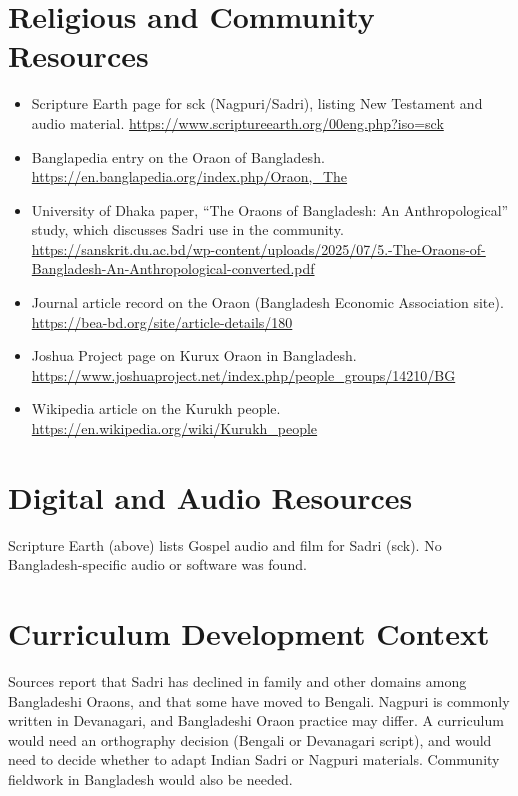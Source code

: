 \documentclass[12pt]{article}
\begin{document}
\section{Religious and Community Resources}
\begin{itemize}
\item Scripture Earth page for sck (Nagpuri/Sadri), listing New Testament and audio material. \url{https://www.scriptureearth.org/00eng.php?iso=sck}
\item Banglapedia entry on the Oraon of Bangladesh. \url{https://en.banglapedia.org/index.php/Oraon,_The}
\item University of Dhaka paper, ``The Oraons of Bangladesh: An Anthropological'' study, which discusses Sadri use in the community. \url{https://sanskrit.du.ac.bd/wp-content/uploads/2025/07/5.-The-Oraons-of-Bangladesh-An-Anthropological-converted.pdf}
\item Journal article record on the Oraon (Bangladesh Economic Association site). \url{https://bea-bd.org/site/article-details/180}
\item Joshua Project page on Kurux Oraon in Bangladesh. \url{https://www.joshuaproject.net/index.php/people_groups/14210/BG}
\item Wikipedia article on the Kurukh people. \url{https://en.wikipedia.org/wiki/Kurukh_people}
\end{itemize}

\section{Digital and Audio Resources}
Scripture Earth (above) lists Gospel audio and film for Sadri (sck). No Bangladesh-specific audio or software was found.

\section{Curriculum Development Context}
Sources report that Sadri has declined in family and other domains among Bangladeshi Oraons, and that some have moved to Bengali. Nagpuri is commonly written in Devanagari, and Bangladeshi Oraon practice may differ. A curriculum would need an orthography decision (Bengali or Devanagari script), and would need to decide whether to adapt Indian Sadri or Nagpuri materials. Community fieldwork in Bangladesh would also be needed.
\end{document}
